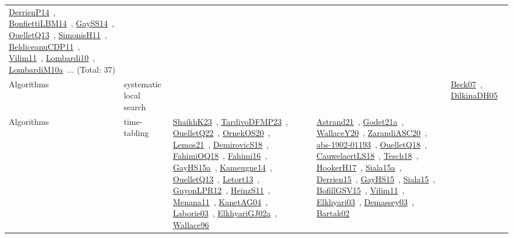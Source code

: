 {\begin{longtable}{lp{3cm}>{\raggedright\arraybackslash}p{6cm}>{\raggedright\arraybackslash}p{6cm}>{\raggedright\arraybackslash}p{8cm}}
\href{../works/DerrienP14.pdf}{DerrienP14}~\cite{DerrienP14}, \href{../works/BonfiettiLBM14.pdf}{BonfiettiLBM14}~\cite{BonfiettiLBM14}, \href{../works/GaySS14.pdf}{GaySS14}~\cite{GaySS14}, \href{../works/OuelletQ13.pdf}{OuelletQ13}~\cite{OuelletQ13}, \href{../works/SimonisH11.pdf}{SimonisH11}~\cite{SimonisH11}, \href{../works/BeldiceanuCDP11.pdf}{BeldiceanuCDP11}~\cite{BeldiceanuCDP11}, \href{../works/Vilim11.pdf}{Vilim11}~\cite{Vilim11}, \href{../works/Lombardi10.pdf}{Lombardi10}~\cite{Lombardi10}, \href{../works/LombardiM10a.pdf}{LombardiM10a}~\cite{LombardiM10a}... (Total: 37)\\
Algorithms & systematic local search &  &  & \href{../works/Beck07.pdf}{Beck07}~\cite{Beck07}, \href{../works/DilkinaDH05.pdf}{DilkinaDH05}~\cite{DilkinaDH05}\\
Algorithms & time-tabling & \href{../works/ShaikhK23.pdf}{ShaikhK23}~\cite{ShaikhK23}, \href{../works/TardivoDFMP23.pdf}{TardivoDFMP23}~\cite{TardivoDFMP23}, \href{../works/OuelletQ22.pdf}{OuelletQ22}~\cite{OuelletQ22}, \href{../works/OrnekOS20.pdf}{OrnekOS20}~\cite{OrnekOS20}, \href{../works/Lemos21.pdf}{Lemos21}~\cite{Lemos21}, \href{../works/DemirovicS18.pdf}{DemirovicS18}~\cite{DemirovicS18}, \href{../works/FahimiOQ18.pdf}{FahimiOQ18}~\cite{FahimiOQ18}, \href{../works/Fahimi16.pdf}{Fahimi16}~\cite{Fahimi16}, \href{../works/GayHS15a.pdf}{GayHS15a}~\cite{GayHS15a}, \href{../works/Kameugne14.pdf}{Kameugne14}~\cite{Kameugne14}, \href{../works/OuelletQ13.pdf}{OuelletQ13}~\cite{OuelletQ13}, \href{../works/Letort13.pdf}{Letort13}~\cite{Letort13}, \href{../works/GuyonLPR12.pdf}{GuyonLPR12}~\cite{GuyonLPR12}, \href{../works/HeinzS11.pdf}{HeinzS11}~\cite{HeinzS11}, \href{../works/Menana11.pdf}{Menana11}~\cite{Menana11}, \href{../works/KanetAG04.pdf}{KanetAG04}~\cite{KanetAG04}, \href{../works/Laborie03.pdf}{Laborie03}~\cite{Laborie03}, \href{../works/ElkhyariGJ02a.pdf}{ElkhyariGJ02a}~\cite{ElkhyariGJ02a}, \href{../works/Wallace96.pdf}{Wallace96}~\cite{Wallace96} & \href{../works/Astrand21.pdf}{Astrand21}~\cite{Astrand21}, \href{../works/Godet21a.pdf}{Godet21a}~\cite{Godet21a}, \href{../works/WallaceY20.pdf}{WallaceY20}~\cite{WallaceY20}, \href{../works/ZarandiASC20.pdf}{ZarandiASC20}~\cite{ZarandiASC20}, \href{../works/abs-1902-01193.pdf}{abs-1902-01193}~\cite{abs-1902-01193}, \href{../works/OuelletQ18.pdf}{OuelletQ18}~\cite{OuelletQ18}, \href{../works/CauwelaertLS18.pdf}{CauwelaertLS18}~\cite{CauwelaertLS18}, \href{../works/Tesch18.pdf}{Tesch18}~\cite{Tesch18}, \href{../works/HookerH17.pdf}{HookerH17}~\cite{HookerH17}, \href{../works/Siala15a.pdf}{Siala15a}~\cite{Siala15a}, \href{../works/Derrien15.pdf}{Derrien15}~\cite{Derrien15}, \href{../works/GayHS15.pdf}{GayHS15}~\cite{GayHS15}, \href{../works/Siala15.pdf}{Siala15}~\cite{Siala15}, \href{../works/BofillGSV15.pdf}{BofillGSV15}~\cite{BofillGSV15}, \href{../works/Vilim11.pdf}{Vilim11}~\cite{Vilim11}, \href{../works/Elkhyari03.pdf}{Elkhyari03}~\cite{Elkhyari03}, \href{../works/Demassey03.pdf}{Demassey03}~\cite{Demassey03}, \href{../works/Bartak02.pdf}{Bartak02}~\cite{Bartak02} & 
\end{longtable}}
